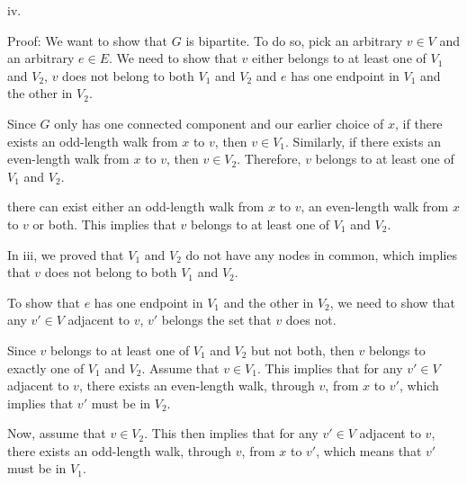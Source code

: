 \documentclass{article}
\renewcommand{\(}{\left(}
\renewcommand{\)}{\right)}
\theoremstyle{plain}
\theoremstyle{plain}
\theoremstyle{definition}
\begin{document}
    iv.
    \begin{shaded}
        Proof: We want to show that $G$ is bipartite. To do so, pick an arbitrary $v\in V$ and an arbitrary $e\in E$. We need to show that $v$ either belongs to at least one of $V_{1}$ and $V_{2}$, $v$ does not belong to both $V_{1}$ and $V_{2}$ and $e$ has one endpoint in $V_{1}$ and the other in $V_{2}$.

        \vspace{4mm}

        Since $G$ only has one connected component and our earlier choice of $x$, if there exists an odd-length walk from $x$ to $v$, then $v\in V_{1}$. Similarly, if there exists an even-length walk from $x$ to $v$, then $v\in V_{2}$. Therefore, $v$ belongs to at least one of $V_{1}$ and $V_{2}$.
        
        there can exist either an odd-length walk from $x$ to $v$, an even-length walk from $x$ to $v$ or both. This implies that $v$ belongs to at least one of $V_{1}$ and $V_{2}$.

        \vspace{4mm}

        In iii, we proved that $V_{1}$ and $V_{2}$ do not have any nodes in common, which implies that $v$ does not belong to both $V_{1}$ and $V_{2}$.

        \vspace{4mm}

        To show that $e$ has one endpoint in $V_{1}$ and the other in $V_{2}$, we need to show that any $v'\in V$ adjacent to $v$, $v'$ belongs the set that $v$ does not. 

        \vspace{4mm}

        Since $v$ belongs to at least one of $V_{1}$ and $V_{2}$ but not both, then $v$ belongs to exactly one of $V_{1}$ and $V_{2}$. Assume that $v\in V_{1}$. This implies that for any $v'\in V$ adjacent to $v$, there exists an even-length walk, through $v$, from $x$ to $v'$, which implies that $v'$ must be in $V_{2}$.

        \vspace{4mm}

        Now, assume that $v\in V_{2}$. This then implies that for any $v'\in V$ adjacent to $v$, there exists an odd-length walk, through $v$, from $x$ to $v'$, which means that $v'$ must be in $V_{1}$.

        \vspace{4mm}


\end{shaded}
\end{document}
